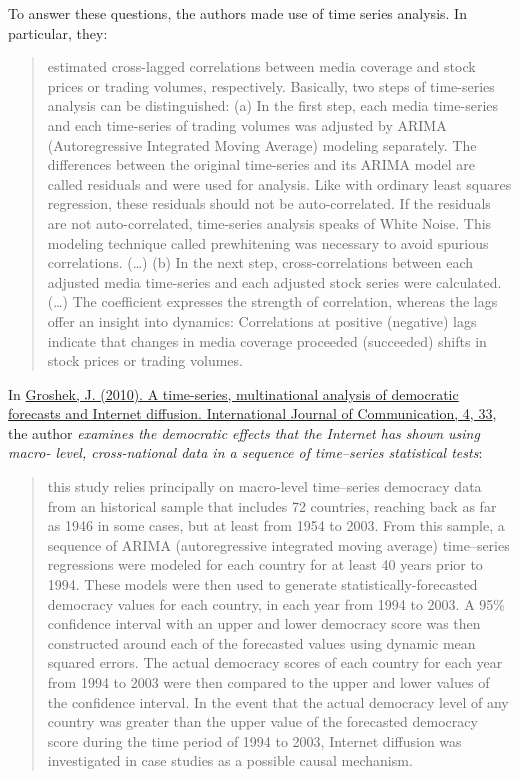 \documentclass[
]{article}
\begin{document}
To answer these questions, the authors made use of time series analysis. In particular, they:

\begin{quote}
estimated cross-lagged correlations between media coverage and stock prices or trading volumes, respectively. Basically, two steps of time-series analysis can be distinguished: (a) In the first step, each media time-series and each time-series of trading volumes was adjusted by ARIMA (Autoregressive Integrated Moving Average) modeling separately. The differences between the original time-series and its ARIMA model are called residuals and were used for analysis. Like with ordinary least squares regression, these residuals should not be auto-correlated. If the residuals are not auto-correlated, time-series analysis speaks of White Noise. This modeling technique called prewhitening was necessary to avoid spurious correlations. (\ldots) (b) In the next step, cross-correlations between each adjusted media time-series and each adjusted stock series were calculated. (\ldots) The coefficient expresses the strength of correlation, whereas the lags offer an insight into dynamics: Correlations at positive (negative) lags indicate that changes in media coverage proceeded (succeeded) shifts in stock prices or trading volumes.
\end{quote}

In \href{https://ijoc.org/index.php/ijoc/article/viewFile/495/392}{Groshek, J. (2010). A time-series, multinational analysis of democratic forecasts and Internet diffusion. International Journal of Communication, 4, 33}, the author \emph{examines the democratic effects that the Internet has shown using macro- level, cross-national data in a sequence of time--series statistical tests}:

\begin{quote}
this study relies principally on macro-level time--series democracy data from an historical sample that includes 72 countries, reaching back as far as 1946 in some cases, but at least from 1954 to 2003. From this sample, a sequence of ARIMA (autoregressive integrated moving average) time--series regressions were modeled for each country for at least 40 years prior to 1994. These models were then used to generate statistically-forecasted democracy values for each country, in each year from 1994 to 2003. A 95\% confidence interval with an upper and lower democracy score was then constructed around each of the forecasted values using dynamic mean squared errors. The actual democracy scores of each country for each year from 1994 to 2003 were then compared to the upper and lower values of the confidence interval.
In the event that the actual democracy level of any country was greater than the upper value of the forecasted democracy score during the time period of 1994 to 2003, Internet diffusion was investigated in case studies as a possible causal mechanism.
\end{quote}
\end{document}
